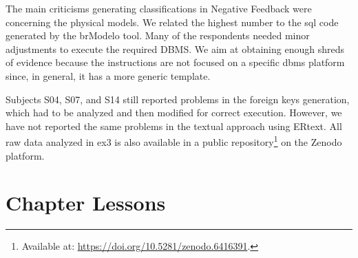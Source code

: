 The main criticisms generating classifications in Negative Feedback were concerning the physical models.
We related the highest number to the \ac{sql} code generated by the brModelo tool. Many of the respondents needed minor adjustments to execute the required DBMS.
We aim at obtaining enough shreds of evidence because the instructions are not focused on a specific \ac{dbms} platform since, in general, it has a more generic template.

Subjects S04, S07, and S14 still reported problems in the foreign keys generation, which had to be analyzed and then modified for correct execution.
However, we have not reported the same problems in the textual approach using ERtext.
All raw data analyzed in \ac{ex3} is also available in a public repository\footnote{Available at: \url{https://doi.org/10.5281/zenodo.6416391}.} on the Zenodo platform.

\section{Chapter Lessons}
\label{sec_experiments:lessons}

